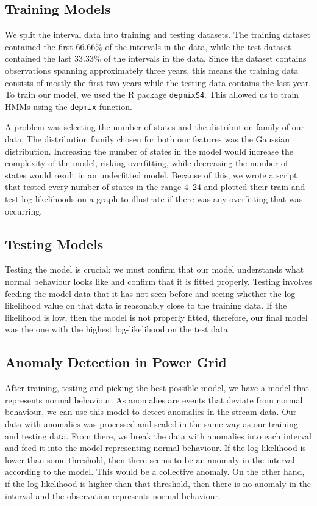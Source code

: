 \documentclass[11pt]{article}
\begin{document}
    \subsection{Training Models}
    We split the interval data into training and testing datasets.
    The training dataset contained the first 66.66\% of the intervals in the data, while the
    test dataset contained the last 33.33\% of the intervals in the data.
    Since the dataset contains observations spanning approximately three years, 
    this means the training data consists of mostly the first two years while the testing data contains the last year.
    To train our model, we used the R package \texttt{depmixS4}.
    This allowed us to train HMMs using the \texttt{depmix} function.

    A problem was selecting the number of states and the distribution family of our data. 
    The distribution family chosen for both our features was the Gaussian distribution.
    Increasing the number of states in the model would increase the complexity of the model,
    risking overfitting, while decreasing the number of states would result in an underfitted
    model.
    Because of this, we wrote a script that tested every number of states in the range 4–24 and
    plotted their train and test log-likelihoods on a graph to illustrate if there was any
    overfitting that was occurring.

    \subsection{Testing Models}
    Testing the model is crucial; we must confirm that our model understands what normal behaviour
    looks like and confirm that it is fitted properly. 
    Testing involves feeding the model data that it has not seen before and seeing whether the
    log-likelihood value on that data is reasonably close to the training data.
    If the likelihood is low, then the model is not properly fitted, therefore, our final model was
    the one with the highest log-likelihood on the test data.

  \subsection{Anomaly Detection in Power Grid}
  After training, testing and picking the best possible model, we have a model that
  represents normal behaviour. 
  As anomalies are events that deviate from normal behaviour, we can use this model to detect
  anomalies in the stream data.
  Our data with anomalies was processed and scaled in the same way as our training and testing data.
  From there, we break the data with anomalies into each interval and feed it into the model
  representing normal behaviour.
  If the log-likelihood is lower than some threshold, then there seems to be an anomaly in the
  interval according to the model. 
  This would be a collective anomaly.
  On the other hand, if the log-likelihood is higher than that threshold, then there is no anomaly
  in the interval and the observation represents normal behaviour. 
\end{document}
